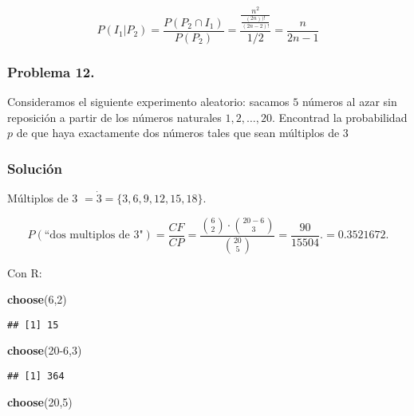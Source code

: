 \documentclass[
]{article}
\newenvironment{Shaded}{\begin{snugshade}}{\end{snugshade}}
\newcommand{\DecValTok}[1]{\textcolor[rgb]{0.00,0.00,0.81}{#1}}
\newcommand{\KeywordTok}[1]{\textcolor[rgb]{0.13,0.29,0.53}{\textbf{#1}}}
\newcommand{\NormalTok}[1]{#1}
\begin{document}
\[
P(I_1|P_2) = \frac{P(P_2 \cap I_1)}{P(P_2)} = \frac{\frac{n^2}{\frac{(2n))!}{(2n - 2)!}}}{1/2} = \frac{n}{2n-1}
\]

\hypertarget{problema-12.}{%
\subsubsection{Problema 12.}\label{problema-12.}}

Consideramos el siguiente experimento aleatorio: sacamos \(5\) números
al azar sin reposición a partir de los números naturales
\(1,2,\dots,20\). Encontrad la probabilidad \(p\) de que haya
exactamente dos números tales que sean múltiplos de \(3\)

\hypertarget{soluciuxf3n-9}{%
\subsubsection{Solución}\label{soluciuxf3n-9}}

Múltiplos de 3 \(=\dot 3= \{3, 6, 9, 12, 15, 18\}.\)

\[
P(\mbox{``dos multiplos de 3"} )=\frac{CF}{CP}=\frac{{{6}\choose{2}}\cdot{{20-6}\choose {3}}}{{{20}\choose{5}}}=\frac{90}{ 15504}.=0.3521672.
\]

Con R:

\begin{Shaded}
\begin{Highlighting}[]
\KeywordTok{choose}\NormalTok{(}\DecValTok{6}\NormalTok{,}\DecValTok{2}\NormalTok{)}
\end{Highlighting}
\end{Shaded}

\begin{verbatim}
## [1] 15
\end{verbatim}

\begin{Shaded}
\begin{Highlighting}[]
\KeywordTok{choose}\NormalTok{(}\DecValTok{20-6}\NormalTok{,}\DecValTok{3}\NormalTok{)}
\end{Highlighting}
\end{Shaded}

\begin{verbatim}
## [1] 364
\end{verbatim}

\begin{Shaded}
\begin{Highlighting}[]
\KeywordTok{choose}\NormalTok{(}\DecValTok{20}\NormalTok{,}\DecValTok{5}\NormalTok{)}
\end{Highlighting}
\end{Shaded}
\end{document}

